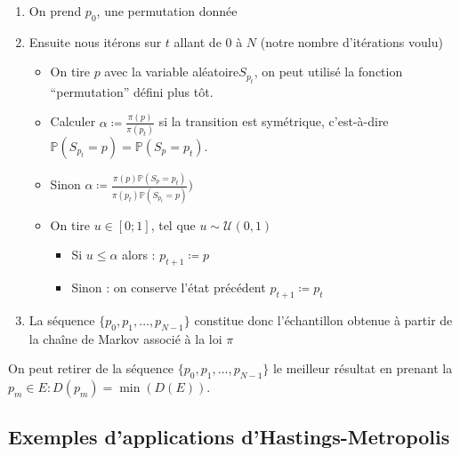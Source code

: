 \documentclass{article}
\begin{document}
\begin{tcolorbox}[colback=white,colframe={rgb,255:red,150; green,56; blue,235},title=Procédure Hastings-Metropolis TSP, breakable]
\begin{enumerate}
    \item On prend $p_0$, une permutation donnée
    \item Ensuite nous itérons sur $t$ allant de 0 à $N$ (notre nombre d'itérations voulu)
    \begin{itemize}
        \item On tire $p$ avec la variable aléatoire$S_{p_t}$, on peut utilisé la fonction ``permutation'' défini plus tôt.
        \item Calculer $\alpha \coloneqq \frac{\pi(p)}{\pi(p_t)}$ si la transition est symétrique, c'est-à-dire $\mathbb{P}(S_{p_t} = p) = \mathbb{P}(S_p = p_t)$.
        \item Sinon $\alpha \coloneqq \frac{\pi(p) \mathbb{P}(S_p = p_t)}{\pi(p_t) \mathbb{P}(S_{p_t} = p) } ) $ 

        \item On tire $u \in [0;1]$, tel que $u  \sim \mathcal{U}(0,1)$ 
        \begin{itemize}
            \item Si $u \leqslant \alpha$ alors : $p_{t+1} \coloneqq p$  
            \item Sinon : on conserve l'état précédent $p_{t+1} \coloneqq p_t$  
        \end{itemize}
    \end{itemize}
    \item La séquence $\{p_0,p_1, \ldots ,p_{N-1}\}$ constitue donc l'échantillon obtenue à partir de la chaîne de Markov associé à la loi $\pi$
\end{enumerate}

On peut retirer de la séquence $\{p_0,p_1, \ldots ,p_{N-1}\}$ le meilleur résultat en prenant la $p_{m} \in E : D(p_{m}) = \min(D(E))$.
\end{tcolorbox}

\subsection{Exemples d'applications d'Hastings-Metropolis}
\end{document}
